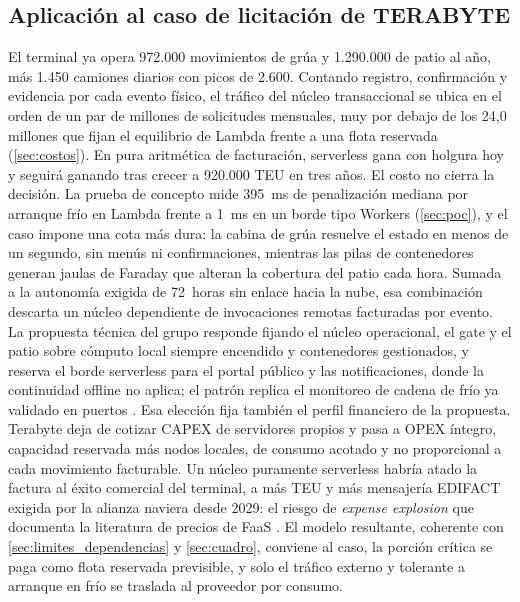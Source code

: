 \documentclass[12pt, letterpaper, table, xcdraw]{inf-pucv}
\begin{document}
\subsection{Aplicación al caso de licitación de TERABYTE}
\label{sec:caso}

El terminal ya opera 972.000 movimientos de grúa y 1.290.000 de patio al año, más 1.450 camiones diarios con picos de 2.600. Contando registro, confirmación y evidencia por cada evento físico, el tráfico del núcleo transaccional se ubica en el orden de un par de millones de solicitudes mensuales, muy por debajo de los 24,0 millones que fijan el equilibrio de Lambda frente a una flota reservada (\ref{sec:costos}). En pura aritmética de facturación, serverless gana con holgura hoy y seguirá ganando tras crecer a 920.000 TEU en tres años. El costo no cierra la decisión. La prueba de concepto mide 395~ms de penalización mediana por arranque frío en Lambda frente a 1~ms en un borde tipo Workers (\ref{sec:poc}), y el caso impone una cota más dura: la cabina de grúa resuelve el estado en menos de un segundo, sin menús ni confirmaciones, mientras las pilas de contenedores generan jaulas de Faraday que alteran la cobertura del patio cada hora. Sumada a la autonomía exigida de 72~horas sin enlace hacia la nube, esa combinación descarta un núcleo dependiente de invocaciones remotas facturadas por evento. La propuesta técnica del grupo responde fijando el núcleo operacional, el gate y el patio sobre cómputo local siempre encendido y contenedores gestionados, y reserva el borde serverless para el portal público y las notificaciones, donde la continuidad offline no aplica; el patrón replica el monitoreo de cadena de frío ya validado en puertos \parencite{kjorveziroski2021iot}. Esa elección fija también el perfil financiero de la propuesta. Terabyte deja de cotizar CAPEX de servidores propios y pasa a OPEX íntegro, capacidad reservada más nodos locales, de consumo acotado y no proporcional a cada movimiento facturable. Un núcleo puramente serverless habría atado la factura al éxito comercial del terminal, a más TEU y más mensajería EDIFACT exigida por la alianza naviera desde 2029: el riesgo de \textit{expense explosion} que documenta la literatura de precios de FaaS \parencite{liu2024demystifying}. El modelo resultante, coherente con \ref{sec:limites_dependencias} y \ref{sec:cuadro}, conviene al caso, la porción crítica se paga como flota reservada previsible, y solo el tráfico externo y tolerante a arranque en frío se traslada al proveedor por consumo.
\end{document}
